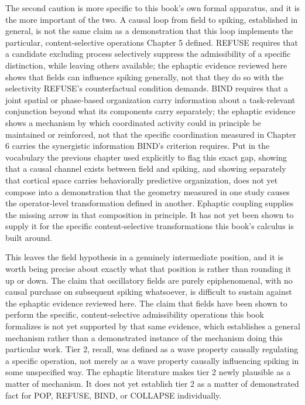 \documentclass[11pt]{book}
\begin{document}
The second caution is more specific to this book's own formal apparatus, and it is the more important of the two. A causal loop from field to spiking, established in general, is not the same claim as a demonstration that this loop implements the particular, content-selective operations Chapter 5 defined. REFUSE requires that a candidate excluding process selectively suppress the admissibility of a specific distinction, while leaving others available; the ephaptic evidence reviewed here shows that fields can influence spiking generally, not that they do so with the selectivity REFUSE's counterfactual condition demands. BIND requires that a joint spatial or phase-based organization carry information about a task-relevant conjunction beyond what its components carry separately; the ephaptic evidence shows a mechanism by which coordinated activity could in principle be maintained or reinforced, not that the specific coordination measured in Chapter 6 carries the synergistic information BIND's criterion requires. Put in the vocabulary the previous chapter used explicitly to flag this exact gap, showing that a causal channel exists between field and spiking, and showing separately that cortical space carries behaviorally predictive organization, does not yet compose into a demonstration that the geometry measured in one study causes the operator-level transformation defined in another. Ephaptic coupling supplies the missing arrow in that composition in principle. It has not yet been shown to supply it for the specific content-selective transformations this book's calculus is built around.

This leaves the field hypothesis in a genuinely intermediate position, and it is worth being precise about exactly what that position is rather than rounding it up or down. The claim that oscillatory fields are purely epiphenomenal, with no causal purchase on subsequent spiking whatsoever, is difficult to sustain against the ephaptic evidence reviewed here. The claim that fields have been shown to perform the specific, content-selective admissibility operations this book formalizes is not yet supported by that same evidence, which establishes a general mechanism rather than a demonstrated instance of the mechanism doing this particular work. Tier 2, recall, was defined as a wave property causally regulating a specific operation, not merely as a wave property causally influencing spiking in some unspecified way. The ephaptic literature makes tier 2 newly plausible as a matter of mechanism. It does not yet establish tier 2 as a matter of demonstrated fact for POP, REFUSE, BIND, or COLLAPSE individually.
\end{document}
